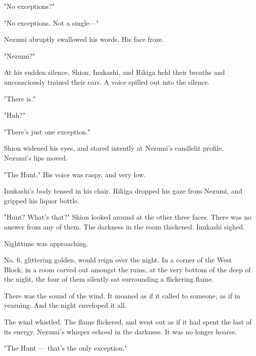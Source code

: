 "No exceptions?"

"No exceptions. Not a single---"

Nezumi abruptly swallowed his words. His face froze.

"Nezumi?"

At his sudden silence, Shion, Inukashi, and Rikiga held their breaths
and unconsciously trained their ears. A voice spilled out into the
silence.

"There is."

"Huh?"

"There's just one exception."

Shion widened his eyes, and stared intently at Nezumi's candlelit
profile. Nezumi's lips moved.

"The Hunt." His voice was raspy, and very low.

Inukashi's body tensed in his chair. Rikiga dropped his gaze from
Nezumi, and gripped his liquor bottle.

"Hunt? What's that?" Shion looked around at the other three faces. There
was no answer from any of them. The darkness in the room thickened.
Inukashi sighed.

Nighttime was approaching.

No. 6, glittering golden, would reign over the night. In a corner of the
West Block, in a room carved out amongst the ruins, at the very bottom
of the deep of the night, the four of them silently sat surrounding a
flickering flame.

There was the sound of the wind. It moaned as if it called to someone,
as if in yearning. And the night enveloped it all.

The wind whistled. The flame flickered, and went out as if it had spent
the last of its energy. Nezumi's whisper echoed in the darkness. It was
no longer hoarse.

"The Hunt --- that's the only exception."